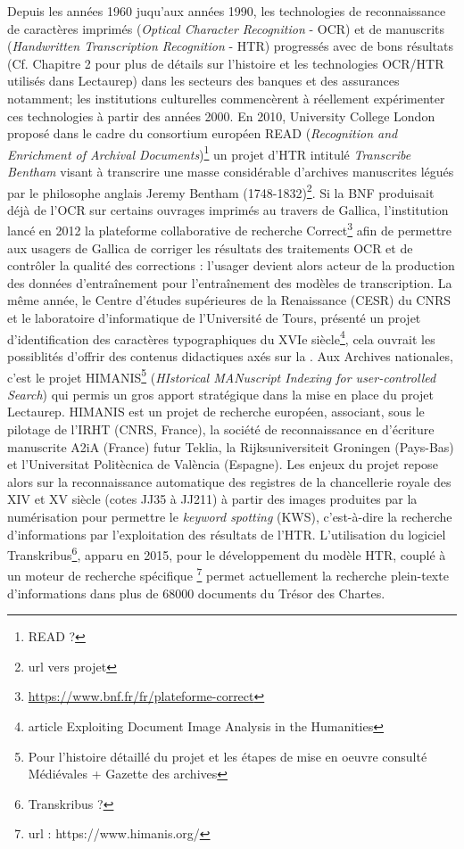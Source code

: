 Depuis les années 1960 juqu'aux années 1990, les technologies de reconnaissance de caractères imprimés (\textit{Optical Character Recognition} - OCR) et de manuscrits (\textit{Handwritten Transcription Recognition} - HTR) progressés avec de bons résultats (Cf. Chapitre 2 pour plus de détails sur l'histoire et les technologies OCR/HTR utilisés dans Lectaurep) dans les secteurs des banques et des assurances notamment; les institutions culturelles commencèrent à réellement expérimenter ces technologies à partir des années 2000. En 2010, University College London proposé dans le cadre du consortium européen READ (\textit{Recognition and Enrichment of Archival Documents})\footnote{READ ?} un projet d'HTR intitulé \textit{Transcribe Bentham} visant à transcrire une masse considérable d'archives manuscrites légués par le philosophe anglais Jeremy Bentham (1748-1832)\footnote{url vers projet}. Si la BNF produisait déjà de l'OCR sur certains ouvrages imprimés au travers de Gallica, l'institution lancé en 2012 la plateforme collaborative de recherche Correct\footnote{\url{https://www.bnf.fr/fr/plateforme-correct}} afin de permettre aux usagers de Gallica de corriger les résultats des traitements OCR et de contrôler la qualité des corrections : l'usager devient alors acteur de la production des données d'entraînement pour l'entraînement des modèles de transcription. La même année, le Centre d'études supérieures de la Renaissance (CESR) du CNRS et le laboratoire d'informatique de l'Université de Tours, présenté un projet d'identification des caractères typographiques du XVIe siècle\footnote{article Exploiting Document Image Analysis in the Humanities}, cela ouvrait les possiblités d'offrir des contenus didactiques axés sur la . Aux Archives nationales, c'est le projet HIMANIS\footnote{Pour l'histoire détaillé du projet et les étapes de mise en oeuvre consulté Médiévales + Gazette des archives} (\textit{HIstorical MANuscript Indexing for user-controlled Search}) qui permis un gros apport stratégique dans la mise en place du projet Lectaurep. HIMANIS est un projet de recherche européen, associant, sous le pilotage de l’IRHT (CNRS, France), la société de reconnaissance en d'écriture manuscrite A2iA (France) futur Teklia, la Rijksuniversiteit Groningen (Pays-Bas) et l’Universitat Politècnica de València (Espagne). Les enjeux du projet repose alors sur la reconnaissance automatique des registres de la chancellerie royale des XIV et XV siècle (cotes JJ35 à JJ211) à partir des images produites par la numérisation pour permettre le \textit{keyword spotting} (KWS), c'est-à-dire la recherche d'informations par l'exploitation des résultats de l'HTR. L'utilisation du logiciel Transkribus\footnote{Transkribus ?}, apparu en 2015, pour le développement du modèle HTR, couplé à un moteur de recherche spécifique \footnote{url : https://www.himanis.org/} permet actuellement la recherche plein-texte d'informations dans plus de 68000 documents du Trésor des Chartes. 


